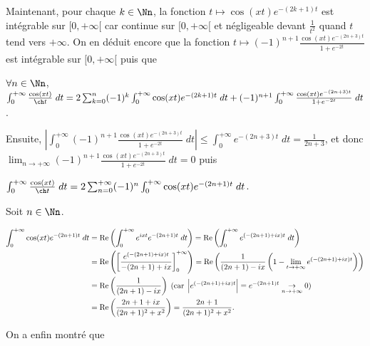 {{Maintenant, pour chaque $k\in\Nn$, la fonction $t\mapsto\cos(xt)e^{-(2k+1)t}$ est intégrable sur $[0,+\infty[$ car continue sur $[0,+\infty[$ et négligeable devant $\frac{1}{t^2}$ quand $t$ tend vers $+\infty$. On en déduit encore que la fonction $t\mapsto (-1)^{n+1}\frac{\cos(xt)e^{-(2n+3)t}}{1+e^{-2t}}$ est intégrable sur $[0,+\infty[$ puis que 

\begin{center}
$\forall n\in\Nn$, $\int_{0}^{+\infty}\frac{\cos(xt)}{\ch t}\;dt=2\sum_{k=0}^{n}(-1)^k\int_{0}^{+\infty}\cos(xt)e^{-(2k+1)t}\;dt+(-1)^{n+1}\int_{0}^{+\infty}\frac{\cos(xt)e^{-(2n+3)t}}{1+e^{-2t}}\;dt$.
\end{center}

Ensuite, $\left|\int_{0}^{+\infty}(-1)^{n+1}\frac{\cos(xt)e^{-(2n+3)t}}{1+e^{-2t}}\;dt\right|\leqslant\int_{0}^{+\infty}e^{-(2n+3)t}\;dt=\frac{1}{2n+3}$, et donc $\lim_{n \rightarrow +\infty}(-1)^{n+1}\frac{\cos(xt)e^{-(2n+3)t}}{1+e^{-2t}}\;dt=0$ puis

\begin{center}
$\int_{0}^{+\infty}\frac{\cos(xt)}{\ch t}\;dt=2\sum_{n=0}^{+\infty}(-1)^n\int_{0}^{+\infty}\cos(xt)e^{-(2n+1)t}\;dt$.
\end{center}

Soit $n\in\Nn$.

\begin{align*}\ensuremath
\int_{0}^{+\infty}\cos(xt)e^{-(2n+1)t}\;dt&=\text{Re}\left(\int_{0}^{+\infty}e^{ixt}e^{-(2n+1)t}\;dt\right)=\text{Re}\left(\int_{0}^{+\infty}e^{(-(2n+1)+ix)t}\;dt\right)\\
 &=\text{Re}\left(\left[\frac{e^{(-(2n+1)+ix)t}}{-(2n+1)+ix}\right]_0^{+\infty}\right)=\text{Re}\left(\frac{1}{(2n+1)-ix}\left(1-\lim_{t \rightarrow +\infty}e^{(-(2n+1)+ix)t}\right)\right)\\
 &=\text{Re}\left(\frac{1}{(2n+1)-ix}\right)\;(\text{car}\;\left|e^{(-(2n+1)+ix)t}\right|=e^{-(2n+1)t}\underset{n\rightarrow+\infty}{\rightarrow}0)\\
 &=\text{Re}\left(\frac{2n+1+ix}{(2n+1)^2+x^2}\right)=\frac{2n+1}{(2n+1)^2+x^2}.
\end{align*}

On a enfin montré que

\begin{center}
\end{center}
}
}
